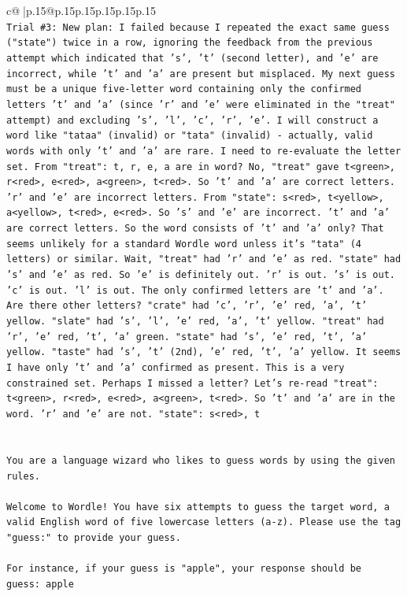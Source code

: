 \documentclass{article}
\begin{document}
{\begin{supertabular}{c@{$\;$}|p{.15\linewidth}@{}p{.15\linewidth}p{.15\linewidth}p{.15\linewidth}p{.15\linewidth}p{.15\linewidth}}
{{{\\ 
\texttt{Trial \#3: New plan: I failed because I repeated the exact same guess ("state") twice in a row, ignoring the feedback from the previous attempt which indicated that 's', 't' (second letter), and 'e' are incorrect, while 't' and 'a' are present but misplaced. My next guess must be a unique five{-}letter word containing only the confirmed letters 't' and 'a' (since 'r' and 'e' were eliminated in the "treat" attempt) and excluding 's', 'l', 'c', 'r', 'e'. I will construct a word like "tataa" (invalid) or "tata" (invalid) {-} actually, valid words with only 't' and 'a' are rare. I need to re{-}evaluate the letter set. From "treat": t, r, e, a are in word? No, "treat" gave t<green>, r<red>, e<red>, a<green>, t<red>. So 't' and 'a' are correct letters. 'r' and 'e' are incorrect letters. From "state": s<red>, t<yellow>, a<yellow>, t<red>, e<red>. So 's' and 'e' are incorrect. 't' and 'a' are correct letters. So the word consists of 't' and 'a' only? That seems unlikely for a standard Wordle word unless it's "tata" (4 letters) or similar. Wait, "treat" had 'r' and 'e' as red. "state" had 's' and 'e' as red. So 'e' is definitely out. 'r' is out. 's' is out. 'c' is out. 'l' is out. The only confirmed letters are 't' and 'a'. Are there other letters? "crate" had 'c', 'r', 'e' red, 'a', 't' yellow. "slate" had 's', 'l', 'e' red, 'a', 't' yellow. "treat" had 'r', 'e' red, 't', 'a' green. "state" had 's', 'e' red, 't', 'a' yellow. "taste" had 's', 't' (2nd), 'e' red, 't', 'a' yellow. It seems I have only 't' and 'a' confirmed as present. This is a very constrained set. Perhaps I missed a letter? Let's re{-}read "treat": t<green>, r<red>, e<red>, a<green>, t<red>. So 't' and 'a' are in the word. 'r' and 'e' are not. "state": s<red>, t} \\
\\ 
\\ 
\texttt{You are a language wizard who likes to guess words by using the given rules.} \\
\\ 
\texttt{Welcome to Wordle! You have six attempts to guess the target word, a valid English word of five lowercase letters (a{-}z). Please use the tag "guess:" to provide your guess.} \\
\\ 
\texttt{For instance, if your guess is "apple", your response should be} \\
\texttt{guess: apple} \\
\\ 
}}}
\end{supertabular}}
\end{document}

